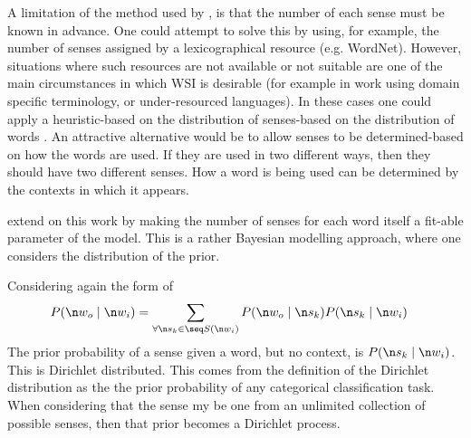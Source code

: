 {A limitation of the method used by \textcite{tian2014probabilistic}, is that the number of each sense must be known in advance.
One could attempt to solve this by using, for example, the number of senses assigned by a lexicographical resource (e.g. WordNet).
However, situations where such resources are not available or not suitable are one of the main circumstances in which WSI is desirable  (for example in work using domain specific terminology, or under-resourced languages).
In these cases one could apply a heuristic-based on the distribution of senses-based on the distribution of words \parencite{zipf1945meaning}.
An attractive alternative would be to allow senses to be determined-based on how the words are used. If they are used in two different ways, then they should have two different senses.
How a word is being used can be determined by the contexts in which it appears.


 extend on this work by making the number of senses for each word itself a fit-able parameter of the model.
This is a rather Bayesian modelling approach, where one considers the distribution of the prior.




Considering again the form of 
\begin{align}
P(\n w_o\mid \n w_i) &= \sum_{\forall \n s_k \in \seq S(\n w_i)} P(\n w_o \mid \n s_k) P(\n s_k \mid \n w_i) 
\end{align}
The prior probability of a sense given a word, but no context, is 
$P(\n s_k \mid \n w_i)$.
This is Dirichlet distributed.
This comes from the definition of the Dirichlet distribution as the the prior probability of any categorical classification task.
When considering that the sense my be one from an unlimited collection of possible senses,
then that prior becomes a Dirichlet process.

}
